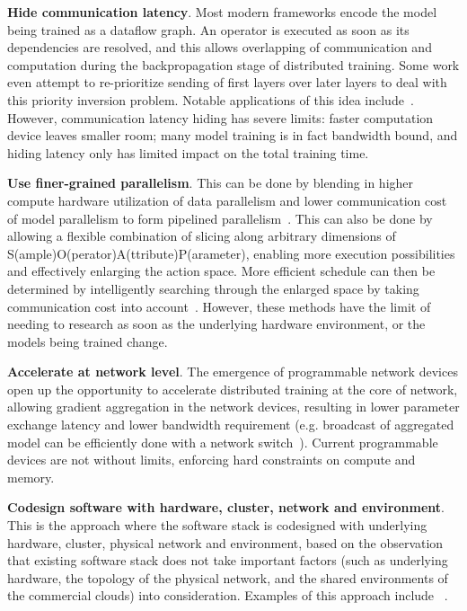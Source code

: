 \noindent\textbf{Hide communication latency}. Most modern frameworks encode the model being trained as a dataflow graph. An operator is executed as soon as its dependencies are resolved, and this allows overlapping of communication and computation during the backpropagation stage of distributed training. Some work even attempt to re-prioritize sending of first layers over later layers to deal with this priority inversion problem. Notable applications of this idea include~\cite{hashemi2018tictac, prioritybased, poseidon, 10.1145/3341b301.3359642}. However, communication latency hiding has severe limits: faster computation device leaves smaller room; many model training is in fact bandwidth bound, and hiding latency only has limited impact on the total training time.

\noindent\textbf{Use finer-grained parallelism}. This can be done by blending in higher compute hardware utilization of data parallelism and lower communication cost of model parallelism to form pipelined parallelism~\cite{harlap2018pipedream}. This can also be done by allowing a flexible combination of slicing along arbitrary dimensions of S(ample)O(perator)A(ttribute)P(arameter), enabling more execution possibilities and effectively enlarging the action space. More efficient schedule can then be determined by intelligently searching through the enlarged space by taking communication cost into account~\cite{jia2018beyond}. However, these methods have the limit of needing to research as soon as the underlying hardware environment, or the models being trained change.

\noindent\textbf{Accelerate at network level}. The emergence of programmable network devices open up the opportunity to accelerate distributed training at the core of network, allowing gradient aggregation in the network devices, resulting in lower parameter exchange latency and lower bandwidth requirement (e.g. broadcast of aggregated model can be efficiently done with a network switch~\cite{sapio2019scaling,luomotivating}). Current programmable devices are not without limits, enforcing hard constraints on compute and memory.

\noindent\textbf{Codesign software with hardware, cluster, network and environment}. This is the approach where the software stack is codesigned with underlying hardware, cluster, physical network and environment, based on the observation that existing software stack does not take important factors (such as underlying hardware, the topology of the physical network, and the shared environments of the commercial clouds) into consideration. Examples of this approach include \plink{}~\cite{phubsocc, phubsysml}.

